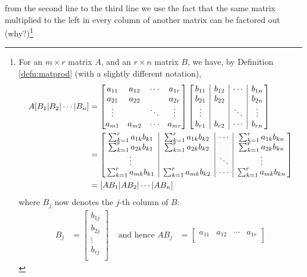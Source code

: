 from the second line to the third line we use the fact that the same matrix multiplied to the left in every column of another matrix can be factored out (why?)\footnote{\label{foot:factorleftmatrix} For an $m \times r$ matrix $A$, and an $r \times n$ matrix $B$, we have, by Definition \ref{defn:matprod} (with a slightly different notation),
\begin{align*}
A[B_1|B_2|\cdots|B_n] &= \begin{bmatrix}
a_{11} & a_{12} & \cdots & a_{1r} \\
a_{21} & a_{22} & & a_{2r} \\
\vdots & & \ddots & \vdots \\
a_{m1} & a_{m2} & \cdots & a_{mr} \\
\end{bmatrix}
\left[\begin{array}{@{\,}c|c|c|c@{\,}}
b_{11} & b_{12} & \cdots & b_{1n} \\
b_{21} & b_{22} & & b_{2n} \\
\vdots & & \ddots & \vdots \\
b_{r1} & b_{r2} & \cdots & b_{rn} \\    
\end{array}\right] \\
&=
\left[\begin{array}{@{\,}c|c|c|c@{\,}}
\sum_{k=1}^r a_{1k}b_{k1} & \sum_{k=1}^r a_{1k}b_{k2} & \cdots & \sum_{k=1}^r a_{1k}b_{kn} \\
\sum_{k=1}^r a_{2k}b_{k1} & \sum_{k=1}^r a_{2k}b_{k2} & & \sum_{k=1}^r a_{2k}b_{kn} \\
\vdots & & \ddots & \vdots \\
\sum_{k=1}^r a_{mk}b_{k1} & \sum_{k=1}^r a_{mk}b_{k2} & \cdots & \sum_{k=1}^r a_{mk}b_{kn} \\
\end{array}\right] \\
&=
[AB_1|AB_2|\cdots|AB_n]
\end{align*} where $B_j$ now denotes the $j$-th column of $B$:
\begin{align*}
B_j &= \begin{bmatrix}
b_{1j} \\
b_{2j} \\
\vdots \\
b_{rj} \\
\end{bmatrix}
&
\text{ and hence }
AB_j &= \begin{bmatrix}
a_{11} & a_{12} & \cdots & a_{1r} \\

\end{bmatrix}
\end{align*}}
